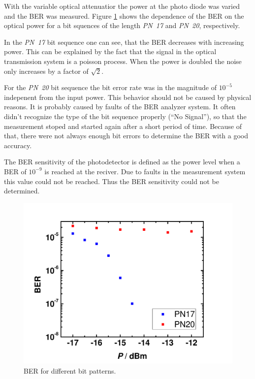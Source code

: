 With the variable optical attenuatior the power at the photo diode was varied and the BER was measured. Figure \ref{fig:BER} shows the dependence of the BER on the optical power for a bit squences of the length \textit{PN~17} and \textit{PN~20}, respectively.
 
In the \textit{PN~17} bit sequence one can see, that the BER decreases with increasing power. This can be explained by the fact that the signal in the optical transmission system is a poisson process. When the power is doubled the noise only increases by a factor of $\sqrt{2}$.

For the \textit{PN~20} bit sequence the bit error rate was in the magnitude of $10^{-5}$ indepenent from the input power. This behavior should not be caused by physical reasons. It is probably caused by faults of the BER analyzer system. It often didn't recognize the type of the bit sequence properly (``No Signal''), so that the measurement stoped and started again after a short period of time. Because of that, there were not always enough bit errors to determine the BER with a good accuracy.

The BER sensitivity of the photodetector is defined as the power level when a BER of $10^{-9}$ is reached at the reciver. Due to faults in the measurement system this value could not be reached. Thus the BER sensitivity could not be determined.


\begin{figure}%
\centering
\includegraphics[width=.6\columnwidth]{Grafiken/BER.pdf}%
\caption{BER for different bit patterns.}%
\label{fig:BER}%
\end{figure}
